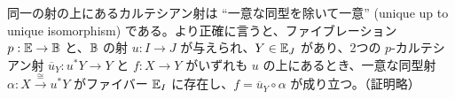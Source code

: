 \documentclass[
		head_space=20mm,
		foot_space=20mm,
		gutter=10mm,
		line_length=190mm
]{jlreq}
\begin{document}
\begin{remark}
	同一の射の上にあるカルテシアン射は ``一意な同型を除いて一意'' (unique up to unique isomorphism) である。より正確に言うと、ファイブレーション $p:\mathbb{E}\to\mathbb{B}$ と、$\mathbb{B}$ の射 $u:I\to J$ が与えられ、$Y\in\mathbb{E}_J$ があり、2つの $p$-カルテシアン射 $\overline{u}_Y:u^\ast Y\to Y$ と $f:X\to Y$ がいずれも $u$ の上にあるとき、一意な同型射 $\alpha:X\xrightarrow{\cong} u^\ast Y$ がファイバー $\mathbb{E}_I$ に存在し、$f=\overline u_Y\circ\alpha$ が成り立つ。（証明略）
	\vspace{2pt}

	\begin{small}
	\begin{center}
	\end{center}
	\end{small}
\end{remark}
\end{document}
